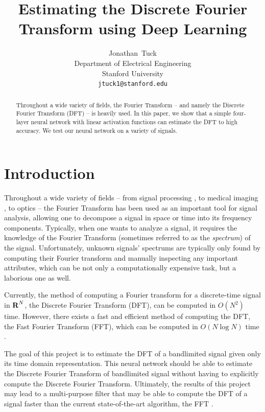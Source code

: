 \documentclass[12pt]{article}
\title{
Estimating the Discrete Fourier Transform using Deep Learning
}
\author{
  Jonathan~Tuck\\
  Department of Electrical Engineering\\
  Stanford University\\
  \texttt{jtuck1@stanford.edu} \\
}
\begin{document}
\maketitle

\begin{abstract}
Throughout a wide variety of fields, the Fourier Transform -- and namely the Discrete Fourier Transform (DFT) -- 
is heavily used. In this paper, we show that a simple four-layer neural network with linear activation functions 
can estimate the DFT to high accuracy. We test our neural network on a variety of signals.
\end{abstract}

\newpage
\tableofcontents
\newpage

\section{Introduction}
Throughout a wide variety of fields -- from signal processing \cite{OS:99}, to medical imaging \cite{S:00}, 
to optics \cite{G:96} -- the Fourier Transform has been used as an important tool for signal analysis, allowing 
one to decompose a signal in space or time into its frequency components. Typically, when one wants to analyze a 
signal, it requires the knowledge of the Fourier Transform (sometimes referred to as the \emph{spectrum}) of the 
signal. Unfortunately, unknown signals' spectrums are typically only found by computing their Fourier transform 
and manually inspecting any important attributes, which can be not only a computationally expensive task, but a 
laborious one as well. 

Currently, the method of computing a Fourier transform for a discrete-time signal in ${\mbox{\bf R}}^N$, the Discrete 
Fourier Transform (DFT), can be computed in $O(N^2)$ time. However, there exists a fast and efficient 
method of computing the DFT, the Fast Fourier Transform (FFT), which can be computed 
in $O(N \log N)$ time \cite{B:78,O:17}.

The goal of this project is to estimate the DFT of a bandlimited signal given only 
its time domain representation. This neural network should be able to estimate the Discrete Fourier 
Transform of bandlimited signal without having to explicitly compute the Discrete Fourier Transform. 
Ultimately, the results of this project may lead to a multi-purpose filter that may be able to compute 
the DFT of a signal faster than the current state-of-the-art algorithm, the FFT \cite{CT:65}.
\end{document}
